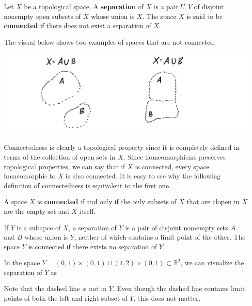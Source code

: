 \documentclass{article}
\begin{document}
    \begin{definition}
    Let $X$ be a topological space. A \textbf{separation} of $X$ is a pair $U, V$ of disjoint nonempty open subsets of $X$ whose union is $X$. The space $X$ is said to be \textbf{connected} if there does not exist a separation of $X$. 

    The visual below shows two examples of spaces that are not connected. 
    \begin{center}
        \includegraphics[scale=0.25]{img/Not_Connected_Spaces_Examples.PNG}
    \end{center}
    \end{definition}

    Connectedness is clearly a topological property since it is completely defined in terms of the collection of open sets in $X$. Since homeomorphisms preserves topological properties, we can say that if $X$ is connected, every space homeomorphic to $X$ is also connected. It is easy to see why the following definition of connectedness is equivalent to the first one. 

    \begin{definition}
    A space $X$ is \textbf{connected} if and only if the only subsets of $X$ that are clopen in $X$ are the empty set and $X$ itself. 
    \end{definition}

    \begin{lemma}
    If $Y$ is a subapce of $X$, a separation of $Y$ is a pair of disjoint nomempty sets $A$ and $B$ whose union is $Y$, neither of which contains a limit point of the other. The space $Y$ is connected if there exists no separation of $Y$. 
    \end{lemma}
    \begin{example}
    In the space $Y = (0,1) \times (0,1) \cup (1,2) \times (0,1) \subset \mathbb{R}^2$, we can visualize the separation of $Y$ as
    \begin{center}
    \end{center}
    Note that the dashed line is not in $Y$. Even though the dashed line contains limit points of both the left and right subset of $Y$, this does not matter. 
    \end{example}
\end{document}
